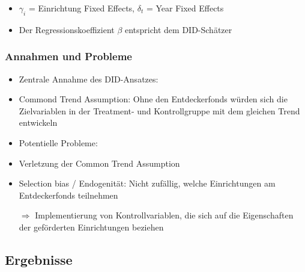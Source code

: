 \begin{frame}[fragile]
\begin{itemize}
\begin{frame}
\begin{itemize}
\begin{frame}[fragile]
\begin{itemize}
\item $\gamma_{i}$ = Einrichtung Fixed Effects, $\delta_{t}$ = Year Fixed Effects
\item Der Regressionskoeffizient $\beta$ entspricht dem DID-Schätzer
\end{itemize}
\end{frame}

\begin{frame}[fragile]
\frametitle{Annahmen und Probleme}
\begin{itemize}
\item Zentrale Annahme des DID-Ansatzes:
\item Commond Trend Assumption: Ohne den Entdeckerfonds würden sich die Zielvariablen in der Treatment- und Kontrollgruppe mit dem gleichen Trend entwickeln
\linebreak
\item Potentielle Probleme:
\item Verletzung der Common Trend Assumption
\item Selection bias / Endogenität: Nicht zufällig, welche Einrichtungen am Entdeckerfonds teilnehmen
\item [$\Rightarrow$] Implementierung von Kontrollvariablen, die sich auf die Eigenschaften der geförderten Einrichtungen beziehen
\end{itemize}
\end{frame}

\subsection{Ergebnisse}


\end{itemize}
\end{frame}
\end{itemize}
\end{frame}
